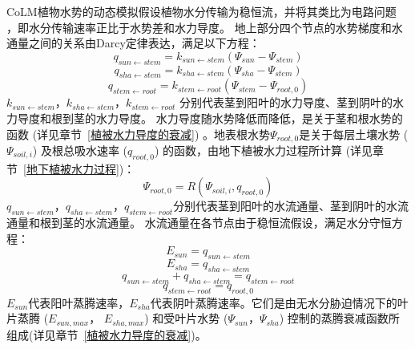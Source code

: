 CoLM植物水势的动态模拟假设植物水分传输为稳恒流，并将其类比为电路问题~
\citep{van1948water}，即水分传输速率正比于水势差和水力导度。
地上部分四个节点的水势梯度和水通量之间的关系由Darcy定律表达，满足以下方程：
\begin{equation}\label{q_sunstem}
q_{ {sun \leftarrow stem }}=k_{{sun} \leftarrow  {stem}}\left(\Psi_{sun}-\Psi_{stem}\right)
\end{equation}
\begin{equation}
q_{ {sha \leftarrow stem }}=k_{ {sha} \leftarrow {stem}}\left(\Psi_{sha}-\Psi_{ {stem }}\right)
\end{equation}
\begin{equation}
q_{ {stem \leftarrow root }}=k_{ {stem } \leftarrow  { root }}\left(\Psi_{ {stem }}-\Psi_{ {root }, 0}\right)
\end{equation}
$k_{sun \leftarrow stem}$，$k_{sha \leftarrow stem }$，$k_{stem \leftarrow root }$ 分别代表茎到阳叶的水力导度、茎到阴叶的水力导度和根到茎的水力导度。
水力导度随水势降低而降低，是关于茎和根水势的函数 (详见章节~\ref{植被水力导度的衰减}) 。地表根水势$\Psi_{root,0}$是关于每层土壤水势 ($\Psi_{soil,i}$) 
及根总吸水速率 ($q_{root,0}$) 的函数，由地下植被水力过程所计算 (详见章节~\ref{地下植被水力过程})：
\begin{equation}\label{Psi_root_0}
\Psi_{root, 0}=R\left(\Psi_{ {soil }, i}, q_{root, 0}\right)
\end{equation}
$q_{sun \leftarrow stem}$，$q_{sha \leftarrow stem }$，$q_{stem \leftarrow root }$分别代表茎到阳叶的水流通量、茎到阴叶的水流通量和根到茎的水流通量。
水流通量在各节点由于稳恒流假设，满足水分守恒方程：
\begin{equation}
E_{sun}=q_{sun \leftarrow  stem}
\end{equation}
\begin{equation}
E_{ {sha }}=q_{ sha \leftarrow stem}
\end{equation}
\begin{equation}
q_{ {sun \leftarrow stem }}+q_{ {sha \leftarrow stem }}=q_{ {stem \leftarrow root }}
\end{equation}
\begin{equation}\label{q_stemroot}
q_{stem \leftarrow root}=q_{root, 0}
\end{equation}
$E_{sun}$代表阳叶蒸腾速率，$E_{sha}$代表阴叶蒸腾速率。它们是由无水分胁迫情况下的叶片蒸腾 ($E_{sun,max}$， $E_{sha,max}$) 
和受叶片水势 ($\Psi_{sun}$，$\Psi_{sha}$) 控制的蒸腾衰减函数所组成(详见章节~\ref{植被水力导度的衰减})。


